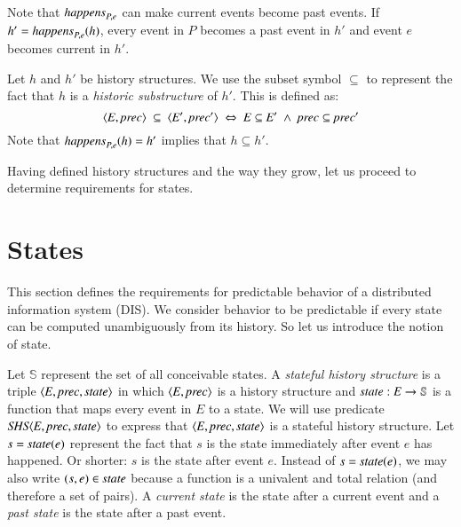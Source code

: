 \documentclass{elsarticle}
\def\id#1{\text{\em #1\/}}
\def\Events{{\mathit E}}
\begin{document}
	Note that $\id{happens}_{P,e}$ can make current events become past events.
	If $h'=\id{happens}_{P,e}(h)$, every event in $P$ becomes a past event in $h'$ and event $e$ becomes current in $h'$.

	Let $h$ and $h'$ be history structures.
	We use the subset symbol $\subseteq$ to represent the fact that $h$ is a {\em historic substructure} of $h'$.
	This is defined as:
\begin{equation}
\label{def:historic substructure}
	\la \Events, \id{prec}\ra\ \subseteq\ \la \Events', \id{prec}'\ra\ \Leftrightarrow\ \Events\subseteq\Events'\ \wedge\ \id{prec}\subseteq\id{prec}'
\end{equation}
	Note that $\id{happens}_{P,e}(h)=h'$ implies that $h\subseteq h'$.

	Having defined history structures and the way they grow, let us proceed to determine requirements for states.

\section{States}
	This section defines the requirements for predictable behavior of a distributed information system (DIS).
	We consider behavior to be predictable if every state can be computed unambiguously from its history.
	So let us introduce the notion of state.

	Let $\mathbb S$ represent the set of all conceivable states.
	A {\em stateful history structure} is a triple $\la\Events, \id{prec}, \id{state}\ra$ in which
	$\la \Events, \id{prec}\ra$ is a history structure and $\id{state}:\Events\rightarrow{\mathbb S}$ is a function
	that maps every event in $\Events$ to a state.
	We will use predicate $\id{SHS}\la \Events, \id{prec}, \id{state}\ra$
	to express that $\la \Events, \id{prec}, \id{state}\ra$ is a stateful history structure.
	Let $s=\id{state}(e)$ represent the fact that $s$ is the state immediately after event $e$ has happened.
	Or shorter: $s$ is the state after event $e$.
	Instead of $s=\id{state}(e)$, we may also write $(s,e)\in\id{state}$ because a function is a univalent and total relation
	(and therefore a set of pairs).
	A {\em current state} is the state after a current event
	and a {\em past state} is the state after a past event.
\end{document}
